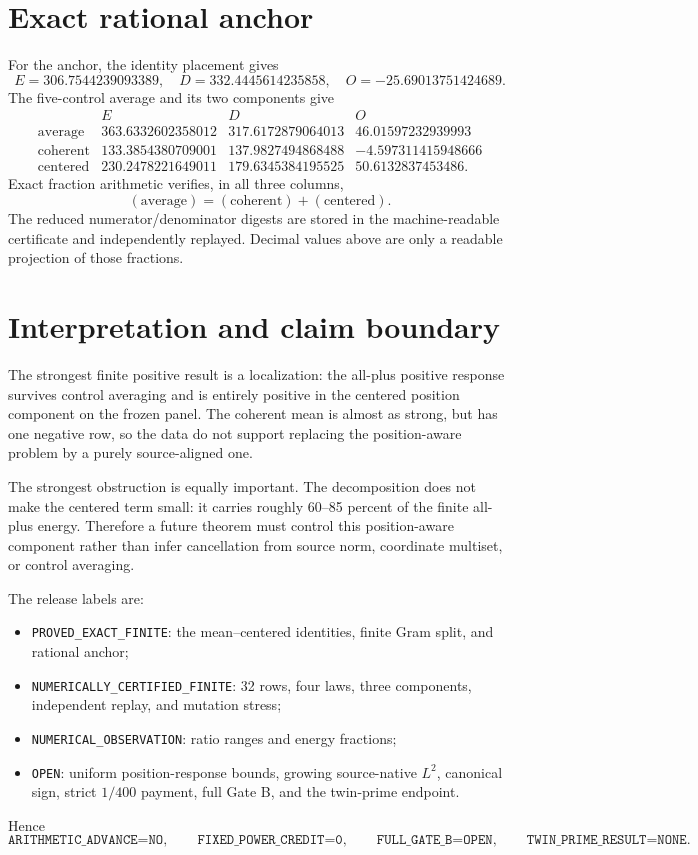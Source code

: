 \documentclass[10pt]{article}
\begin{document}
\section{Exact rational anchor}

For the anchor, the identity placement gives
\[
 E=306.7544239093389,\quad D=332.4445614235858,\quad
 O=-25.69013751424689.
\]
The five-control average and its two components give
\[
\begin{array}{c|rrr}
 &E&D&O\\ \hline
\text{average}&363.6332602358012&317.6172879064013&46.01597232939993\\
\text{coherent}&133.3854380709001&137.9827494868488&-4.597311415948666\\
\text{centered}&230.2478221649011&179.6345384195525&50.6132837453486.
\end{array}
\]
Exact fraction arithmetic verifies, in all three columns,
\[
 (\text{average})=(\text{coherent})+(\text{centered}).
\]
The reduced numerator/denominator digests are stored in the machine-readable
certificate and independently replayed.  Decimal values above are only a
readable projection of those fractions.

\section{Interpretation and claim boundary}

The strongest finite positive result is a localization: the all-plus positive
response survives control averaging and is entirely positive in the centered
position component on the frozen panel.  The coherent mean is almost as
strong, but has one negative row, so the data do not support replacing the
position-aware problem by a purely source-aligned one.

The strongest obstruction is equally important.  The decomposition does not
make the centered term small: it carries roughly 60--85 percent of the
finite all-plus energy.  Therefore a future theorem must control this
position-aware component rather than infer cancellation from source norm,
coordinate multiset, or control averaging.

The release labels are:
\begin{itemize}
  \item \texttt{PROVED\_EXACT\_FINITE}: the mean--centered identities,
        finite Gram split, and rational anchor;
  \item \texttt{NUMERICALLY\_CERTIFIED\_FINITE}: 32 rows, four laws, three
        components, independent replay, and mutation stress;
  \item \texttt{NUMERICAL\_OBSERVATION}: ratio ranges and energy fractions;
  \item \texttt{OPEN}: uniform position-response bounds, growing
        source-native $L^2$, canonical sign, strict $1/400$ payment, full
        Gate B, and the twin-prime endpoint.
\end{itemize}
Hence
\[
 \texttt{ARITHMETIC\_ADVANCE=NO},\qquad
 \texttt{FIXED\_POWER\_CREDIT=0},\qquad
 \texttt{FULL\_GATE\_B=OPEN},\qquad
 \texttt{TWIN\_PRIME\_RESULT=NONE}.
\]
\end{document}
